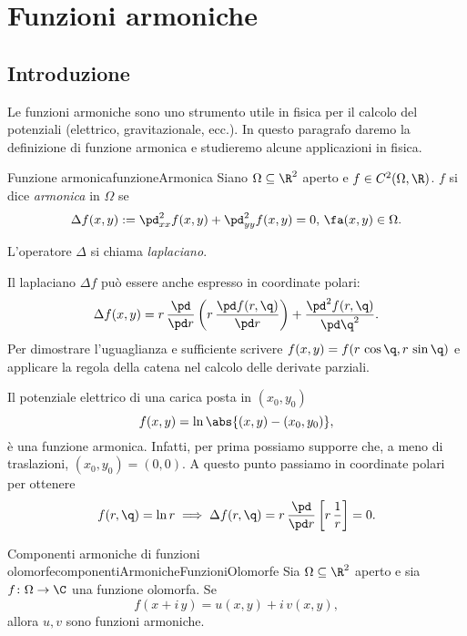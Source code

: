 %
%
\chapter{Funzioni armoniche}
\section{Introduzione}

Le funzioni armoniche sono uno strumento utile in fisica per il calcolo del potenziali (elettrico, gravitazionale, ecc.).
In questo paragrafo daremo la definizione di funzione armonica e studieremo alcune applicazioni in fisica.

\begin{defn}{Funzione armonica}{funzioneArmonica}
	Siano \(\Omega\subseteq \R^2\) aperto e \(f\in C^2(\Omega,\R)\).
	\(f\) si dice \emph{armonica} in \(\Omega\) se
	\[
		\Delta f(x,y) := \pd_{xx}^2 f(x,y) + \pd_{yy}^2 f(x,y) = 0,\,\fa (x,y)\in \Omega.
	\]
\end{defn}

\begin{notz}
	L'operatore \(\Delta\) si chiama \emph{laplaciano}.
\end{notz}

\begin{oss}
	Il laplaciano \(\Delta f\) può essere anche espresso in coordinate polari:
	\[
		\Delta f(x,y) = r\,\frac{\pd}{\pd r} \left( r\,\frac{\pd f(r,\q)}{\pd r} \right) + \frac{\pd^2 f(r,\q)}{\pd \q^2}.
	\]
	Per dimostrare l'uguaglianza e sufficiente scrivere \(f(x,y) = f(r\,\cos \q,r\,\sin \q)\) e applicare la regola della catena nel calcolo delle derivate parziali.
\end{oss}

\begin{ese}
	Il potenziale elettrico di una carica posta in \((x_0,y_0)\) 
	\[
		f(x,y) = \ln \abs{(x,y)-(x_0,y_0)},
	\]
	è una funzione armonica.
	Infatti, per prima possiamo supporre che, a meno di traslazioni, \((x_0,y_0)=(0,0)\). A questo punto passiamo in coordinate polari per ottenere
	\[
		f(r,\q) = \ln r \implies \Delta f(r,\q) = r\,\frac{\pd}{\pd r} \left[ r\,\frac{1}{r} \right] = 0.
	\]
\end{ese}

\begin{prop}{Componenti armoniche di funzioni olomorfe}{componentiArmonicheFunzioniOlomorfe}
	Sia \(\Omega \subseteq \R^2\) aperto e sia \(f\colon \Omega \to \C\) una funzione olomorfa. Se
	\[
		f(x+i\,y) = u(x,y) + i\,v(x,y),
	\]
	allora \(u,v\) sono funzioni armoniche.
\end{prop}

